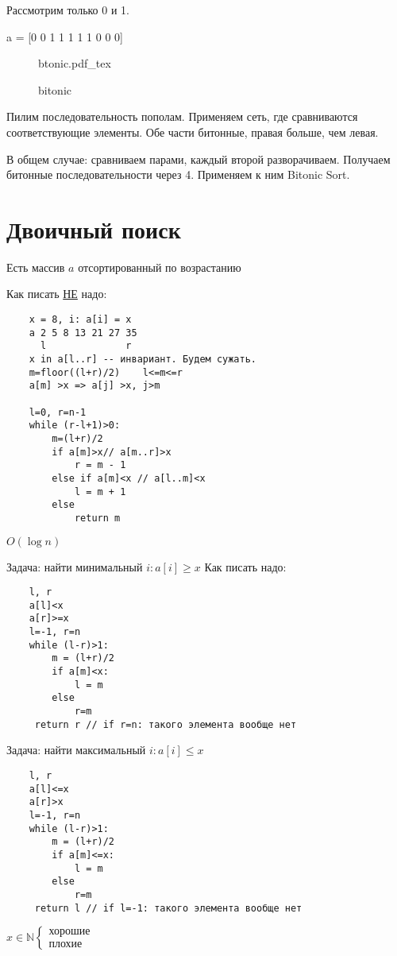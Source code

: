 \documentclass{book}
\newcommand\N{\ensuremath{\mathbb{N}}}
\theoremstyle{definition}
\newcommand{\incfig}[1]{%
    \def\svgwidth{\columnwidth}
    {#1.pdf_tex}
}
\begin{document}
Рассмотрим только 0 и 1. 

a = [0 0 1 1 1 1 1 0 0 0]

\begin{figure}[ht]
    \centering
    \incfig{btonic}
    \caption{bitonic}
    \label{fig:btonic}
\end{figure}

Пилим последовательность пополам. Применяем сеть, где сравниваются соответствующие элементы. Обе части битонные, правая больше, чем левая.


В общем случае: сравниваем парами, каждый второй разворачиваем. Получаем битонные последовательности через 4. Применяем к ним Bitonic Sort.

\section{Двоичный поиск}

Есть массив $a$ отсортированный по возрастанию

Как писать \underline{НЕ} надо:
 \begin{verbatim}
    x = 8, i: a[i] = x
    a 2 5 8 13 21 27 35
      l              r
    x in a[l..r] -- инвариант. Будем сужать.
    m=floor((l+r)/2)    l<=m<=r
    a[m] >x => a[j] >x, j>m

    l=0, r=n-1
    while (r-l+1)>0:
        m=(l+r)/2
        if a[m]>x// a[m..r]>x
            r = m - 1
        else if a[m]<x // a[l..m]<x
            l = m + 1
        else
            return m
 \end{verbatim}

 $O(\log n)$

 Задача: найти минимальный $i:a[i]\geqslant x$
 Как писать надо:
 \begin{verbatim}
    l, r
    a[l]<x
    a[r]>=x
    l=-1, r=n
    while (l-r)>1:
        m = (l+r)/2
        if a[m]<x:
            l = m
        else
            r=m
     return r // if r=n: такого элемента вообще нет
 \end{verbatim}

 Задача: найти максимальный $i: a[i]\leqslant x$
 \begin{verbatim}
    l, r
    a[l]<=x
    a[r]>x
    l=-1, r=n
    while (l-r)>1:
        m = (l+r)/2
        if a[m]<=x:
            l = m
        else
            r=m
     return l // if l=-1: такого элемента вообще нет
 \end{verbatim}

$x\in \N  \begin{cases}
    \text{хорошие}\\
    \text{плохие}
\end{cases}$
\end{document}
